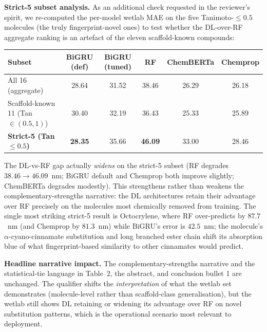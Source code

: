 \documentclass[11pt]{article}
\begin{document}
{\textbf{Strict-5 subset analysis.} As an additional check requested in the reviewer's spirit, we re-computed the per-model wetlab MAE on the five Tanimoto-$\leq 0.5$ molecules (the truly fingerprint-novel ones) to test whether the DL-over-RF aggregate ranking is an artefact of the eleven scaffold-known compounds:

\begin{center}\small
\begin{tabular}{lccccc}
\toprule
\textbf{Subset} & \textbf{BiGRU (def)} & \textbf{BiGRU (tuned)} & \textbf{RF} & \textbf{ChemBERTa} & \textbf{Chemprop} \\
\midrule
All 16 (aggregate)                       & 28.64 & 31.52 & 38.46 & 26.29 & 26.18 \\
Scaffold-known 11 (Tan $\in (0.5, 1)$)   & 30.40 & 32.19 & 36.43 & 25.33 & 25.89 \\
\textbf{Strict-5 (Tan $\leq 0.5$)}       & \textbf{28.35} & 35.66 & \textbf{46.09} & 33.00 & 28.46 \\
\bottomrule
\end{tabular}
\end{center}

The DL-vs-RF gap actually \emph{widens} on the strict-5 subset (RF degrades $38.46 \to 46.09$~nm; BiGRU default and Chemprop both improve slightly; ChemBERTa degrades modestly). This strengthens rather than weakens the complementary-strengths narrative: the DL architectures retain their advantage over RF precisely on the molecules most chemically removed from training. The single most striking strict-5 result is Octocrylene, where RF over-predicts by $87.7$~nm (and Chemprop by $81.3$~nm) while BiGRU's error is $42.5$~nm; the molecule's $\alpha$-cyano-cinnamate substitution and long branched ester chain shift its absorption blue of what fingerprint-based similarity to other cinnamates would predict.

\textbf{Headline narrative impact.} The complementary-strengths narrative and the statistical-tie language in Table~2, the abstract, and conclusion bullet 1 are unchanged. The qualifier shifts the \emph{interpretation} of what the wetlab set demonstrates (molecule-level rather than scaffold-class generalisation), but the wetlab still shows DL retaining or widening its advantage over RF on novel substitution patterns, which is the operational scenario most relevant to deployment.}
\end{document}
